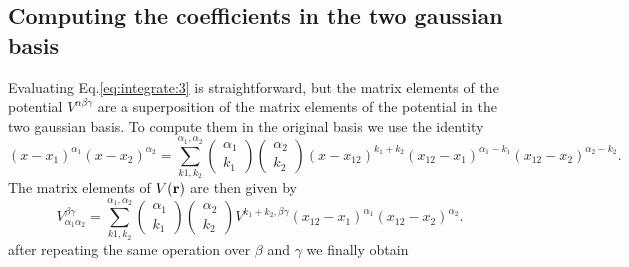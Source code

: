 \documentclass[prb]{revtex4}
\begin{document}
\subsection{Computing the coefficients in the two gaussian basis}
Evaluating Eq.\ref{eq:integrate:3} is straightforward, but the matrix elements
of the potential $V^{\alpha\beta\gamma}$ are a superposition of the matrix
elements of the potential in the two gaussian basis. To compute them in the
original basis we use the identity
\begin{equation}
  \label{eq:integrate:4}
  (x - x_1)^{\alpha_1}(x - x_2)^{\alpha_2} = \sum_{k1, k_2}^{\alpha_1,\alpha_2} \left(\begin{array}{c}
      \alpha_1\\ k_1
  \end{array}\right)
  \left(
  \begin{array}{c}
    \alpha_2\\ k_2
  \end{array}
  \right)
  (x - x_{12})^{k_1 + k_2} (x_{12} - x_1)^{\alpha_1 - k_1} (x_{12} - x_2)^{\alpha_2 - k_2}.
\end{equation}
The matrix elements of $V({\bf r})$ are then given by
\begin{equation}
  V_{\alpha_1\alpha_2}^{\beta\gamma} = \sum_{k1, k_2}^{\alpha_1,\alpha_2} \left(\begin{array}{c}
    \alpha_1\\ k_1
  \end{array}\right)\left(\begin{array}{c}
    \alpha_2\\ k_2
  \end{array}\right)V^{k_1 + k_2,\beta\gamma} (x_{12} - x_1)^{\alpha_1} (x_{12} - x_2)^{\alpha_2}.
\end{equation}
after repeating the same operation over $\beta$ and $\gamma$ we finally obtain
\end{document}
